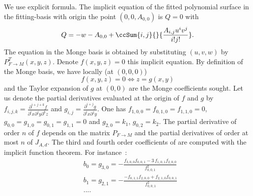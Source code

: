 \begin{ccAdvanced}
We use explicit formula. The implicit equation of the fitted
polynomial surface in the fitting-basis with origin the point
$(0,0,A_{0,0})$ is $Q=0$ with
\begin{equation}
Q=-w-A_{0,0}  +\ccSum{i,j}{}{\frac{A_{i,j}u^iv^j}{i!j!}}.
\end{equation}
The equation in the Monge basis is obtained by substituting $(u,v,w)$
by $P^T_{F\rightarrow M}(x,y,z)$. Denote $f(x,y,z)=0$ this implicit
equation. By definition of the Monge basis, we have locally (at
$(0,0,0)$)
\begin{equation}
f(x,y,z)=0 \Leftrightarrow z=g(x,y)
\end{equation}
and the Taylor expansion of $g$ at $(0,0)$ are the Monge coefficients
sought.
%
Let us denote the partial derivatives evaluated at the origin of $f$
and $g$ by $f_{i,j,k}=\frac{\partial^{i+j+k}f}{\partial^ix
\partial^jy \partial^kz}$ and $g_{i,j}=\frac{\partial^{i+j}g}{\partial^ix
\partial^jy}$. One has $f_{1,0,0}=f_{0,1,0}=f_{1,1,0}=0$,
$g_{0,0}=g_{1,0}=g_{0,1}=g_{1,1}=0$ and $g_{2,0}=k_1$,
$g_{0,2}=k_2$. The partial derivative of order $n$ of $f$ depends on
the matrix $P_{F\rightarrow M}$ and the partial derivatives of order
at most $n$ of $J_{A,d}$. The third and fourth order coefficients of are
computed with the implicit function theorem. For instance~:
\begin{eqnarray*}
&b_0=g_{3,0}=-{\frac { f_{3,0,0} f_{0,0,1} -3\, f_{1,0,1} f_{2,0,0} }{
f_{0,0,1} ^{2}}}
\\
&b_1=g_{2,1}=-{\frac {-  f_{0,1,1}      f_{2,0,0}    +  f_{2,1,0}    f_{0,0,1}  }{  f_{0,0,1}    ^{2}}}
\\
& .... \\
\end{eqnarray*} 
 \end{ccAdvanced} 

